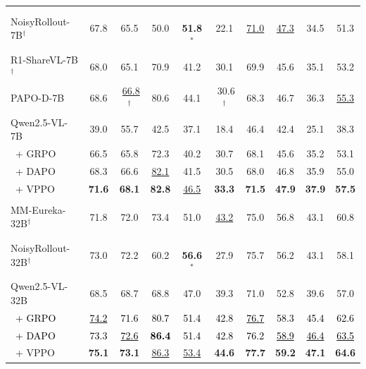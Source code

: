 \begin{table}[t]
\begin{tabularx}{\textwidth}{l|cccccc|c|c|C}
            NoisyRollout-7B$^\dag$ & 67.8 & 65.5 & 50.0 & \,\,\textbf{51.8}$^*$ & 22.1 & \underline{71.0} & \underline{47.3} & 34.5 & 51.3 \\
            R1-ShareVL-7B$^\dag$ & 68.0 & 65.1 & 70.9 & 41.2 & 30.1 & 69.9 & 45.6 & 35.1 & 53.2 \\
            PAPO-D-7B & 68.6 & \,\,\underline{66.8}$^\dag$ & 80.6 & 44.1 & \,\,30.6$^\dag$ & 68.3 & 46.7 & 36.3 & \underline{55.3} \\
            \midrule
            Qwen2.5-VL-7B & 39.0 & 55.7 & 42.5 & 37.1 & 18.4 & 46.4 & 42.4 & 25.1 & 38.3 \\
            \qquad\quad\, + GRPO & 66.5 & 65.8 & 72.3 & 40.2 & 30.7 & 68.1 & 45.6 & 35.2 & 53.1 \\
            \qquad\quad\, + DAPO & 68.3 & 66.6 & \underline{82.1} & 41.5 & 30.5 & 68.0 & 46.8 & 35.9 & 55.0 \\
             \qquad\quad\, + VPPO & \textbf{71.6} & \textbf{68.1} & \textbf{82.8} & \underline{46.5} & \textbf{33.3} & \textbf{71.5} & \textbf{47.9} & \textbf{37.9} & \textbf{57.5} \\
            \midrule
            \midrule
             \\
            \midrule
            MM-Eureka-32B$^\dag$ & 71.8 & 72.0 & 73.4 & 51.0 & \underline{43.2} & 75.0 & 56.8 & 43.1 & 60.8 \\
            NoisyRollout-32B$^\dag$ & 73.0 & 72.2 & 60.2 & \,\,\textbf{56.6}$^*$ & 27.9 & 75.7 & 56.2 & 43.1 & 58.1 \\
            \midrule
            Qwen2.5-VL-32B & 68.5 & 68.7 & 68.8 & 47.0 & 39.3 & 71.0 & 52.8 & 39.6 & 57.0 \\
            \qquad\quad\, \textcolor{black}{+ GRPO} & \underline{\textcolor{black}{74.2}} & \textcolor{black}{71.6} & \textcolor{black}{80.7} & \textcolor{black}{51.4} & \textcolor{black}{42.8} & \underline{\textcolor{black}{76.7}} & \textcolor{black}{58.3} & \textcolor{black}{45.4} & \textcolor{black}{62.6} \\
\qquad\quad\, \textcolor{black}{+ DAPO} & \textcolor{black}{73.3} & \underline{\textcolor{black}{72.6}} & \textbf{\textcolor{black}{86.4}} & \textcolor{black}{51.4} & \textcolor{black}{42.8} & \textcolor{black}{76.2} & \underline{\textcolor{black}{58.9}} & \underline{\textcolor{black}{46.4}} & \underline{\textcolor{black}{63.5}} \\
             \qquad\quad\, + VPPO & \textbf{75.1} & \textbf{73.1} & \underline{86.3} & \underline{53.4} & \textbf{44.6} & \textbf{77.7} & \textbf{59.2} & \textbf{47.1} & \textbf{64.6} \\
            \bottomrule
        \end{tabularx}
    \label{tab:main_result}
    \vspace{-4mm}
\end{table}
